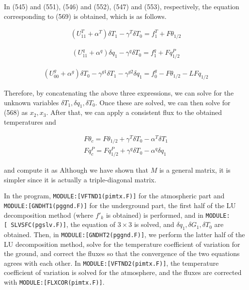 In (545) and (551), (546) and (552), (547) and (553), respectively, the equation corresponding to (569) is obtained, which is as follows.

\begin{eqnarray}
  ( U^{T}_{11} +  \alpha^{T}  ) \delta T_1 - \gamma^{T} \delta T_0
      = f^{T}_1 + F\theta_{1/2}
\end{eqnarray}

\begin{eqnarray}
  ( U^{q}_{11} +  \alpha^{q}  ) \delta q_1 - \gamma^{q} \delta T_0
      = f^{q}_1 + Fq^P_{1/2}
\end{eqnarray}

\begin{eqnarray}
  ( U^{g}_{00} +  \alpha^{g}  ) \delta T_0 - \gamma^{g1} \delta T_1
                                           - \gamma^{g2} \delta q_1
      = f^{g}_0 - F\theta_{1/2} - L Fq_{1/2}
\end{eqnarray}

Therefore, by concatenating the above three expressions, we can solve for the unknown variables \(\delta T_1, \delta q_1, \delta T_0\). Once these are solved, we can then solve for (568) as
\(x_2,x_3\). After that, we can apply a consistent flux to the obtained temperatures and

\begin{eqnarray}
  F\theta_c  =  F\theta_{1/2}
                   + \gamma^{T} \delta T_0 -\alpha^{T} \delta T_1 \\
  Fq^P_c  =  Fq^P_{1/2}
                   + \gamma^{q} \delta T_0 -\alpha^{q} \delta q_1
\end{eqnarray}

and compute it as Although we have shown that \(M\) is a general matrix, it is simpler since it is actually a triple-diagonal matrix.

In the program, \texttt{MODULE:{[}VFTND1(pimtx.F){]}} for the atmospheric part and \texttt{MODULE:{[}GNDHT1(pggnd.F){]}} for the underground part, the first half of the LU decomposition method (where
\(f'_k\) is obtained) is performed, and in \texttt{MODULE:{[}\ SLVSFC(pgslv.F){]}}, the equation of \(3\times 3\) is solved, and \(\delta q_1, \delta G_1, \delta T_0\) are obtained. Then, in
\texttt{MODULE:{[}GNDHT2(pggnd.F){]}}, we perform the latter half of the LU decomposition method, solve for the temperature coefficient of variation for the ground, and correct the fluxes so that the
convergence of the two equations agrees with each other. In \texttt{MODULE:{[}VFTND2(pimtx.F){]}}, the temperature coefficient of variation is solved for the atmosphere, and the fluxes are corrected
with \texttt{MODULE:{[}FLXCOR(pimtx.F){]}}.

